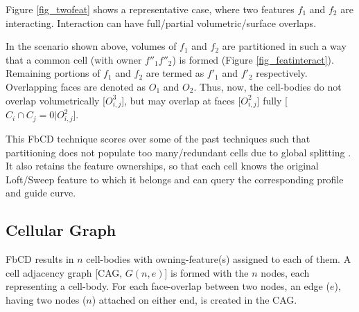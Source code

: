 Figure \ref{fig_twofeat} shows a representative case, where two features $f_1$ and $f_2$ are interacting. Interaction can have full/partial volumetric/surface overlaps. 

In the scenario shown above, volumes of $f_1$ and $f_2$ are partitioned in such a way that a common cell (with owner $f''_1f''_2$) is formed (Figure \ref{fig_featinteract}). Remaining portions of $f_1$ and $f_2$ are termed as $f'_1$ and $f'_2$ respectively.  Overlapping faces are denoted as $O_1$ and $O_2$. Thus, now, the cell-bodies do not overlap volumetrically [$O_{i,j}^3$], but may overlap at faces [$O_{i,j}^2$] fully [ $C_i \cap C_j = 0| O_{i,j}^2$].

This FbCD technique scores over some of the past techniques such that partitioning does not populate too many/redundant cells due to global splitting  \cite{Chong2004, Kageura2009, Cao2011, Woo2009, Boussuge2013}. It also retains the feature ownerships, so that each cell knows the original Loft/Sweep feature to which it belongs and can query the corresponding profile and guide curve.

\subsection{Cellular Graph} \label{cagd:sec:cellulargraph}
FbCD results in $n$ cell-bodies with owning-feature(s) assigned to each of them. A cell adjacency graph [CAG, $G(n,e)$] is formed with the $n$ nodes, each representing a cell-body. For each face-overlap between two nodes, an edge ($e$), having two nodes ($n$) attached on either end, is created in the CAG.    

